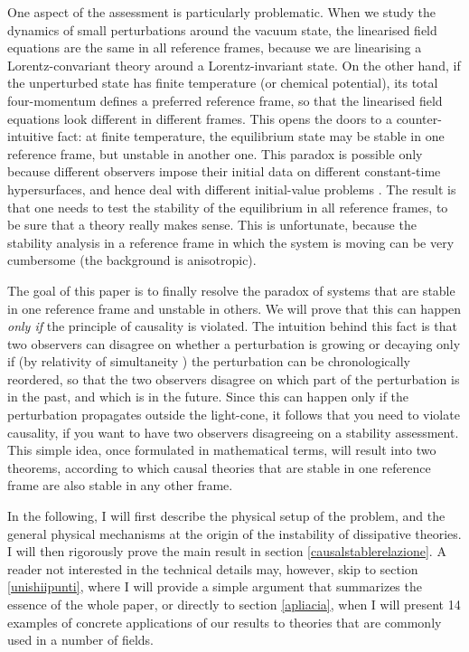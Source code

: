 \documentclass[a4paper, amsfonts, amssymb, amsmath, reprint, showkeys,  twoside, onecolumn,notitlepage,nofootinbib]{revtex4-1}
\theoremstyle{definition}
\theoremstyle{theorem}
\begin{document}
One aspect of the assessment is particularly problematic. When we study the dynamics of small perturbations around the vacuum state, the linearised field equations are the same in all reference frames, because we are linearising a Lorentz-convariant theory around a Lorentz-invariant state. On the other hand, if the unperturbed state has finite temperature (or chemical potential), its total four-momentum defines a preferred reference frame, so that the linearised field equations look different in different frames. This opens the doors to a counter-intuitive fact: at finite temperature, the equilibrium state may be stable in one reference frame, but unstable in another one. This paradox is possible only because different observers impose their initial data on different constant-time hypersurfaces, and hence deal with different initial-value problems \cite{Kost2000,GavassinoLyapunov_2020,GavassinoUEIT2021}. The result is that one needs to test the stability of the equilibrium in all reference frames, to be sure that a theory really makes sense. This is unfortunate, because the stability analysis in a reference frame in which the system is moving can be very cumbersome (the background is anisotropic).



The goal of this paper is to finally resolve the paradox of systems that are stable in one reference frame and unstable in others. We will prove that this can happen \textit{only if} the principle of causality is violated. The intuition behind this fact is that two observers can disagree on whether a perturbation is growing or decaying only if (by relativity of simultaneity \cite{special_in_gen}) the perturbation can be chronologically reordered, so that the two observers disagree on which part of the perturbation is in the past, and which is in the future. Since this can happen only if the perturbation propagates outside the light-cone, it follows that you need to violate causality, if you want to have two observers disagreeing on a stability assessment. This simple idea, once formulated in mathematical terms, will result into two theorems, according to which causal theories that are stable in one reference frame are also stable in any other frame.



In the following, I will first describe the physical setup of the problem, and the general physical mechanisms at the origin of the instability of dissipative theories. I will then rigorously prove the main result in section \ref{causalstablerelazione}. A reader not interested in the technical details may, however, skip to section \ref{unishiipunti}, where I will provide a simple argument that summarizes the essence of the whole paper, or directly to section \ref{apliacia}, when I will present 14 examples of concrete applications of our results to theories that are commonly used in a number of fields.
\end{document}
